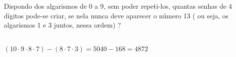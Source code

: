 \begin{ex}
Dispondo dos algarismos de 0 a 9,  sem poder repeti-los, quantas senhas de 4 dígitos pode-se criar, se nela nunca deve aparecer o número 13 ( ou seja, os algarismos 1 e 3 juntos, nessa ordem) ?
  \begin{sol}
   \phantom{A} \\
    $(10\cdot9\cdot8\cdot7)-(8\cdot7\cdot3)=5040-168=4872$
  \end{sol}
\end{ex}